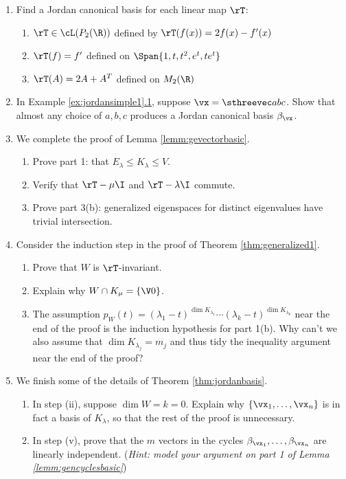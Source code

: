 \begin{exercises}
\begin{enumerate}
	\item Find a Jordan canonical basis for each linear map $\rT$:
	\begin{enumerate}
	  \item $\rT\in\cL(P_2(\R))$ defined by $\rT(f(x))=2f(x)-f'(x)$
	  \item $\rT(f)=f'$ defined on $\Span\{1,t,t^2,e^t,te^t\}$
	  \item $\rT(A)=2A+A^T$ defined on $M_2(\R)$
	\end{enumerate}
	
	\item In Example \hyperref[ex:jordansimple1]{\ref*{ex:jordansimple1}.1}, suppose $\vx=\sthreevec abc$. Show that almost any choice of $a,b,c$ produces a Jordan canonical basis $\beta_\vx$.

  
  \item We complete the proof of Lemma \ref{lemm:gevectorbasic}.
  \begin{enumerate}
    \item Prove part 1: that $E_\lambda\le K_\lambda\le V$.
    \item Verify that $\rT-\mu\I$ and $\rT-\lambda\I$ commute.
    \item Prove part 3(b): generalized eigenspaces for distinct eigenvalues have trivial intersection.
  \end{enumerate}
  
  \item Consider the induction step in the proof of Theorem \ref{thm:generalized1}.
  \begin{enumerate}
    \item Prove that $W$ is $\rT$-invariant.
    \item Explain why $W\cap K_\mu=\{\V0\}$.
    \item The assumption $p_W(t)=(\lambda_1-t)^{\dim K_{\lambda_1}}\cdots (\lambda_k-t)^{\dim K_{\lambda_k}}$ near the end of the proof is the induction hypothesis for part 1(b). Why can't we also assume that $\dim K_{\lambda_j}=m_j$ and thus tidy the inequality argument near the end of the proof?
  \end{enumerate}
  
  \item We finish some of the details of Theorem \ref{thm:jordanbasis}.
  \begin{enumerate}
    \item In step (ii), suppose $\dim W=k=0$. Explain why $\{\vx_1,\ldots,\vx_n\}$ is in fact a basis of $K_\lambda$, so that the rest of the proof is unnecessary.
    \item In step (v), prove that the $m$ vectors in the cycles $\beta_{\vx_1},\ldots,\beta_{\vx_n}$ are linearly independent.\smallbreak
    (\emph{Hint: model your argument on part 1 of Lemma \ref{lemm:gencyclesbasic}})
  \end{enumerate}
 
\end{enumerate}
\end{exercises}


